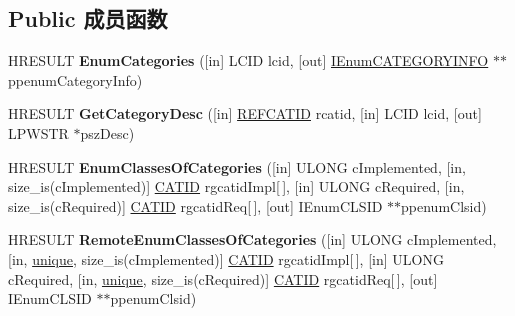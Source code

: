 \subsection*{Public 成员函数}
\begin{DoxyCompactItemize}
\item 
\mbox{\label{interface_i_cat_information_adb75e2bfd4c1a103178ddd99df6090a7}} 
H\+R\+E\+S\+U\+LT {\bfseries Enum\+Categories} (\mbox{[}in\mbox{]} L\+C\+ID lcid, \mbox{[}out\mbox{]} \hyperlink{interface_i_enum_c_a_t_e_g_o_r_y_i_n_f_o}{I\+Enum\+C\+A\+T\+E\+G\+O\+R\+Y\+I\+N\+FO} $\ast$$\ast$ppenum\+Category\+Info)
\item 
\mbox{\label{interface_i_cat_information_aa2fcafc1092a5759de7de32bbc0c8028}} 
H\+R\+E\+S\+U\+LT {\bfseries Get\+Category\+Desc} (\mbox{[}in\mbox{]} \hyperlink{struct___g_u_i_d}{R\+E\+F\+C\+A\+T\+ID} rcatid, \mbox{[}in\mbox{]} L\+C\+ID lcid, \mbox{[}out\mbox{]} L\+P\+W\+S\+TR $\ast$psz\+Desc)
\item 
\mbox{\label{interface_i_cat_information_abf5b623972bf0583aaf9318e447baf1a}} 
H\+R\+E\+S\+U\+LT {\bfseries Enum\+Classes\+Of\+Categories} (\mbox{[}in\mbox{]} U\+L\+O\+NG c\+Implemented, \mbox{[}in, size\+\_\+is(c\+Implemented)\mbox{]} \hyperlink{interface_g_u_i_d}{C\+A\+T\+ID} rgcatid\+Impl\mbox{[}$\,$\mbox{]}, \mbox{[}in\mbox{]} U\+L\+O\+NG c\+Required, \mbox{[}in, size\+\_\+is(c\+Required)\mbox{]} \hyperlink{interface_g_u_i_d}{C\+A\+T\+ID} rgcatid\+Req\mbox{[}$\,$\mbox{]}, \mbox{[}out\mbox{]} I\+Enum\+C\+L\+S\+ID $\ast$$\ast$ppenum\+Clsid)
\item 
\mbox{\label{interface_i_cat_information_afb1bc5f816046571e8b3a572bb4a2701}} 
H\+R\+E\+S\+U\+LT {\bfseries Remote\+Enum\+Classes\+Of\+Categories} (\mbox{[}in\mbox{]} U\+L\+O\+NG c\+Implemented, \mbox{[}in, \hyperlink{interfaceunique}{unique}, size\+\_\+is(c\+Implemented)\mbox{]} \hyperlink{interface_g_u_i_d}{C\+A\+T\+ID} rgcatid\+Impl\mbox{[}$\,$\mbox{]}, \mbox{[}in\mbox{]} U\+L\+O\+NG c\+Required, \mbox{[}in, \hyperlink{interfaceunique}{unique}, size\+\_\+is(c\+Required)\mbox{]} \hyperlink{interface_g_u_i_d}{C\+A\+T\+ID} rgcatid\+Req\mbox{[}$\,$\mbox{]}, \mbox{[}out\mbox{]} I\+Enum\+C\+L\+S\+ID $\ast$$\ast$ppenum\+Clsid)
\item 
\mbox{\label{interface_i_cat_information_aac5b2205f5eaf1a05d5300216586da65}} 
$$
\end{DoxyCompactItemize}
